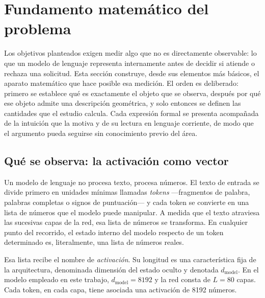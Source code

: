 %


\section{Fundamento matemático del problema}

\justifying

Los objetivos planteados exigen medir algo que no es directamente observable:
lo que un modelo de lenguaje representa internamente antes de decidir si
atiende o rechaza una solicitud. Esta sección construye, desde sus elementos
más básicos, el aparato matemático que hace posible esa medición. El orden es
deliberado: primero se establece qué es exactamente el objeto que se observa,
después por qué ese objeto admite una descripción geométrica, y solo entonces
se definen las cantidades que el estudio calcula. Cada expresión formal se
presenta acompañada de la intuición que la motiva y de su lectura en lenguaje
corriente, de modo que el argumento pueda seguirse sin conocimiento previo del
área.

\subsection{Qué se observa: la activación como vector}

Un modelo de lenguaje no procesa texto, procesa números. El texto de entrada se
divide primero en unidades mínimas llamadas \textit{tokens} —fragmentos de
palabra, palabras completas o signos de puntuación— y cada token se convierte
en una lista de números que el modelo puede manipular. A medida que el texto
atraviesa las sucesivas capas de la red, esa lista de números se transforma. En
cualquier punto del recorrido, el estado interno del modelo respecto de un
token determinado es, literalmente, una lista de números reales.

Esa lista recibe el nombre de \textit{activación}. Su longitud es una
característica fija de la arquitectura, denominada dimensión del estado oculto
y denotada $d_{\text{model}}$. En el modelo empleado en este trabajo,
$d_{\text{model}} = 8192$ y la red consta de $L = 80$ capas. Cada token, en
cada capa, tiene asociada una activación de 8192 números.

